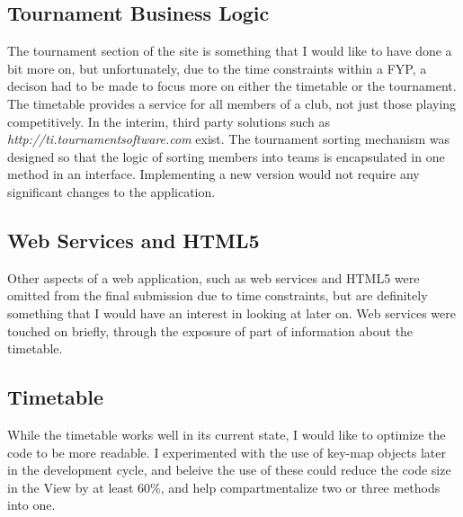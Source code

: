 \subsection{Tournament Business Logic}

The tournament section of the site is something that I would like to have done a bit more on, but unfortunately, due to the time constraints within a FYP, a decison had to be made to focus more on either the timetable or the tournament. The timetable provides a service for all members of a club, not just those playing competitively. In the interim, third party solutions such as \textit{http://ti.tournamentsoftware.com} exist. The tournament sorting mechanism was designed so that the logic of sorting members into teams is encapsulated in one method in an interface. Implementing a new version would not require any significant changes to the application. 

\subsection{Web Services and HTML5}
Other aspects of a web application, such as web services and HTML5 were omitted from the final submission due to time constraints, but are definitely something that I would have an interest in looking at later on. Web services were touched on briefly, through the exposure of part of information about the timetable. 

\subsection{Timetable}
While the timetable works well in its current state, I would like to optimize the code to be more readable. I experimented with the use of key-map objects later in the development cycle, and beleive the use of these could reduce the code size in the View by at least 60\%, and help compartmentalize two or three methods into one.